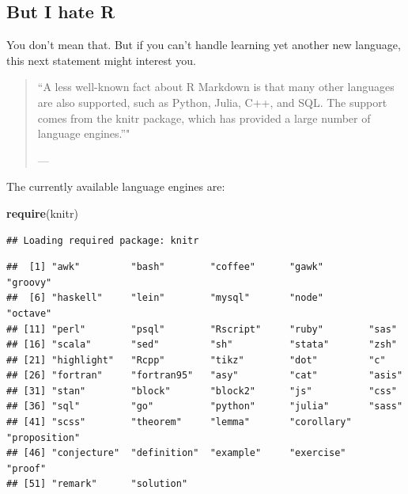 \documentclass[11pt,]{article}
\newenvironment{Shaded}{\begin{snugshade}}{\end{snugshade}}
\newcommand{\KeywordTok}[1]{\textcolor[rgb]{0.13,0.29,0.53}{\textbf{#1}}}
\newcommand{\NormalTok}[1]{#1}
\newcommand{\OperatorTok}[1]{\textcolor[rgb]{0.81,0.36,0.00}{\textbf{#1}}}
\begin{document}
\hypertarget{pleaseNotR}{%
\subsection{But I hate R}\label{pleaseNotR}}

You don't mean that. But if you can't handle learning yet another new language, this next statement might interest you.

\begin{quote}
``A less well-known fact about R Markdown is that many other languages are also supported, such as Python, Julia, C++, and SQL. The support comes from the knitr package, which has provided a large number of language engines.''"

--- \citet{R-Markdown-Guide}
\end{quote}

The currently available language engines are:

\begin{Shaded}
\begin{Highlighting}[]
\KeywordTok{require}\NormalTok{(knitr)}
\end{Highlighting}
\end{Shaded}

\begin{verbatim}
## Loading required package: knitr
\end{verbatim}

\begin{Shaded}
\end{Shaded}

\begin{verbatim}
##  [1] "awk"         "bash"        "coffee"      "gawk"        "groovy"     
##  [6] "haskell"     "lein"        "mysql"       "node"        "octave"     
## [11] "perl"        "psql"        "Rscript"     "ruby"        "sas"        
## [16] "scala"       "sed"         "sh"          "stata"       "zsh"        
## [21] "highlight"   "Rcpp"        "tikz"        "dot"         "c"          
## [26] "fortran"     "fortran95"   "asy"         "cat"         "asis"       
## [31] "stan"        "block"       "block2"      "js"          "css"        
## [36] "sql"         "go"          "python"      "julia"       "sass"       
## [41] "scss"        "theorem"     "lemma"       "corollary"   "proposition"
## [46] "conjecture"  "definition"  "example"     "exercise"    "proof"      
## [51] "remark"      "solution"
\end{verbatim}
\end{document}

